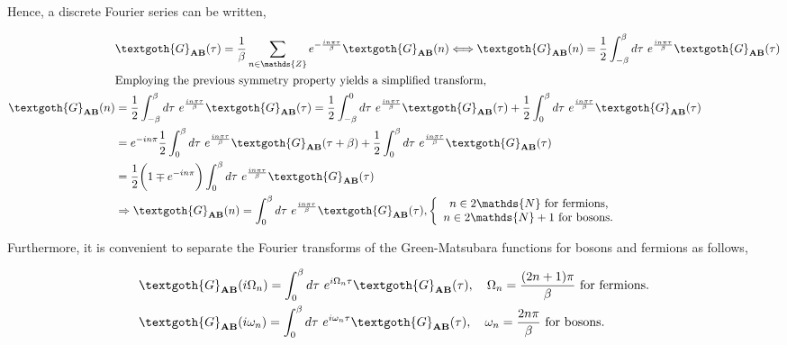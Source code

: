 Hence, a discrete Fourier series can be written, 

\begin{equation}
\begin{split}
    &{\textgoth{G}_{{\bf AB}}}(\tau) = \frac{1}{\beta} \sum_{n \in \mathds{Z}} e^{-\frac{in\pi\tau}{\beta}} {\textgoth{G}_{{\bf AB}}}(n) \Longleftrightarrow {\textgoth{G}_{{\bf AB}}}(n) = \frac{1}{2} \int_{-\beta}^{\beta} d\tau \blanky e^{\frac{in\pi\tau}{\beta}} {\textgoth{G}_{{\bf AB}}}(\tau) \\
    &\textnormal{Employing the previous symmetry property yields a simplified transform, }\\
    {\textgoth{G}_{{\bf AB}}}(n) &= \frac{1}{2} \int_{-\beta}^{\beta} d\tau \blanky e^{\frac{in\pi\tau}{\beta}} {\textgoth{G}_{{\bf AB}}}(\tau) = \frac{1}{2} \int_{-\beta}^{0} d\tau \blanky e^{\frac{in\pi\tau}{\beta}} {\textgoth{G}_{{\bf AB}}}(\tau) + \frac{1}{2} \int_{0}^{\beta} d\tau \blanky e^{\frac{in\pi\tau}{\beta}} {\textgoth{G}_{{\bf AB}}}(\tau) \\
    &= e^{-in\pi} \frac{1}{2} \int_{0}^{\beta} d\tau \blanky e^{\frac{in\pi\tau}{\beta}} {\textgoth{G}_{{\bf AB}}}(\tau + \beta) + \frac{1}{2} \int_{0}^{\beta} d\tau \blanky e^{\frac{in\pi\tau}{\beta}} {\textgoth{G}_{{\bf AB}}}(\tau) \\
    &= \frac{1}{2} \bigg(1 \mp e^{-in\pi}\bigg) \int_{0}^{\beta} d\tau \blanky e^{\frac{in\pi\tau}{\beta}} {\textgoth{G}_{{\bf AB}}}(\tau) \\
    &\Rightarrow {\textgoth{G}_{{\bf AB}}}(n) = \int_{0}^{\beta} d\tau \blanky e^{\frac{in\pi\tau}{\beta}} {\textgoth{G}_{{\bf AB}}}(\tau), \left\{ \begin{array}{cc}
        n \in 2\mathds{N} \textnormal{ for fermions, }   \\
        n \in 2\mathds{N}+1 \textnormal{ for bosons. }
    \end{array} \right.\\
\end{split}
\end{equation}

Furthermore, it is convenient to separate the Fourier transforms of the Green-Matsubara functions for bosons and fermions as follows,

\begin{equation}
    \begin{split}
        &{\textgoth{G}_{{\bf AB}}}(i\Omega_n) = \int_{0}^{\beta} d\tau \blanky e^{i \Omega_n \tau} {\textgoth{G}_{{\bf AB}}}(\tau), \quad \Omega_n = \frac{(2n+1)\pi}{\beta} \textnormal{ for fermions.} \\
        &{\textgoth{G}_{{\bf AB}}}(i\omega_n) = \int_{0}^{\beta} d\tau \blanky e^{i \omega_n \tau} {\textgoth{G}_{{\bf AB}}}(\tau), \quad \omega_n = \frac{2n\pi}{\beta} \textnormal{ for bosons.}
    \end{split}
\end{equation}

